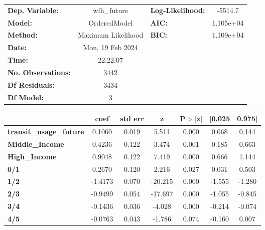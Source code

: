 \documentclass{report}
\begin{document}
\begin{center}
\begin{tabular}{lclc}
\toprule
\textbf{Dep. Variable:}         &    wfh\_future     & \textbf{  Log-Likelihood:    } &   -5514.7   \\
\textbf{Model:}                 &    OrderedModel    & \textbf{  AIC:               } & 1.105e+04   \\
\textbf{Method:}                & Maximum Likelihood & \textbf{  BIC:               } & 1.109e+04   \\
\textbf{Date:}                  &  Mon, 19 Feb 2024  & \textbf{                     } &             \\
\textbf{Time:}                  &      22:22:07      & \textbf{                     } &             \\
\textbf{No. Observations:}      &         3442       & \textbf{                     } &             \\
\textbf{Df Residuals:}          &         3434       & \textbf{                     } &             \\
\textbf{Df Model:}              &            3       & \textbf{                     } &             \\
\bottomrule
\end{tabular}
\begin{tabular}{lcccccc}
                                & \textbf{coef} & \textbf{std err} & \textbf{z} & \textbf{P$> |$z$|$} & \textbf{[0.025} & \textbf{0.975]}  \\
\midrule
\textbf{transit\_usage\_future} &       0.1060  &        0.019     &     5.511  &         0.000        &        0.068    &        0.144     \\
\textbf{Middle\_Income}         &       0.4236  &        0.122     &     3.474  &         0.001        &        0.185    &        0.663     \\
\textbf{High\_Income}           &       0.9048  &        0.122     &     7.419  &         0.000        &        0.666    &        1.144     \\
\textbf{0/1}                    &       0.2670  &        0.120     &     2.216  &         0.027        &        0.031    &        0.503     \\
\textbf{1/2}                    &      -1.4173  &        0.070     &   -20.215  &         0.000        &       -1.555    &       -1.280     \\
\textbf{2/3}                    &      -0.9499  &        0.054     &   -17.697  &         0.000        &       -1.055    &       -0.845     \\
\textbf{3/4}                    &      -0.1436  &        0.036     &    -4.028  &         0.000        &       -0.214    &       -0.074     \\
\textbf{4/5}                    &      -0.0763  &        0.043     &    -1.786  &         0.074        &       -0.160    &        0.007     \\
\bottomrule
\end{tabular}
\end{center}
\end{document}
